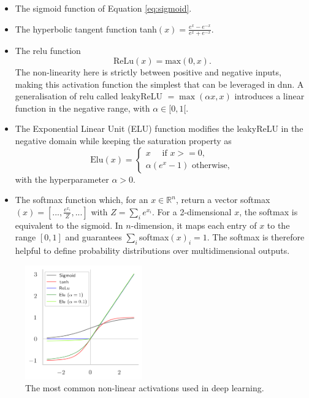 \begin{itemize}
    \item The sigmoid function of Equation \ref{eq:sigmoid}.
    \item The hyperbolic tangent function tanh$(x) = \frac{e^x - e^{-x}}{e^x + e^{-x}}$.
    \item The \gls{relu} function\cite{agarap2019deep}
    \begin{equation}\label{eq:relu}
        \text{ReLu}(x) = \text{max}(0, x).
    \end{equation}
    The non-linearity here is strictly between positive and negative inputs, making this activation function the simplest that can be leveraged in \gls{dnn}. A generalisation of \gls{relu} called leakyReLU $= \max(\alpha x, x)$ introduces a linear function in the negative range, with $\alpha \in [0, 1[$. 
    \item The Exponential Linear Unit (ELU) function modifies the leakyReLU in the negative domain while keeping the saturation property as
    \begin{equation}\label{eq:elu}
        \text{Elu}(x) = 
        \begin{cases}
            x \quad \text{ if } x >= 0, \\
            \alpha (e^x - 1) \text{ otherwise},
        \end{cases}
    \end{equation}
    with the hyperparameter $\alpha > 0$.
    \item The softmax function which, for an $x \in \mathbb{R}^n$, return a vector softmax$(x) = [..., \frac{e^{x_i}}{Z}, ...]$ with $Z = \sum_i e^{x_i}$. For a 2-dimensional $x$, the softmax is equivalent to the sigmoid. In $n$-dimension, it maps each entry of $x$ to the range $[0, 1]$ and guarantees $\sum_i $softmax$(x)_i = 1$. The softmax is therefore helpful to define probability distributions over multidimensional outputs.
\end{itemize}
\begin{figure}
    \begin{center}
        \includegraphics[width=0.45\textwidth]{Images/ML/activations.png}
        \caption{The most common non-linear activations used in deep learning.} 
        \label{fig:commonAct}
    \end{center}
\end{figure}

